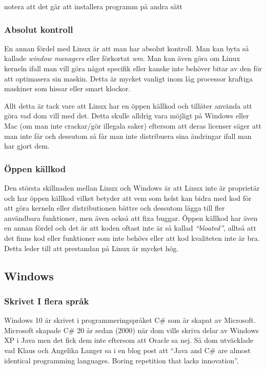 \documentclass[12pt, a4paper]{report}
\begin{document}
    \small{notera att det går att installera programm på andra sätt}


    \subsubsection{Absolut kontroll}

   En annan fördel med Linux är att man har absolut kontroll. Man kan byta så kallade \textit{window managers} eller förkortat \textit{wm}\cite{wm}. Man kan även göra om Linux kerneln ifall man vill göra något specifik eller kanske inte behöver bitar av den för att optimasera sin maskin. Detta är mycket vanligt inom låg processor kraftiga maskiner som hissar eller smart klockor.

   Allt detta är tack vare att Linux har en öppen källkod och tillåter använda att göra vad dom vill med det. Detta skulle alldrig vara möjligt på Windows eller Mac (om man inte crackar/gör illegala saker) eftersom att deras licenser säger att man inte får och dessutom så får man inte distribuera sina ändringar ifall man har gjort dem.

   \subsubsection{Öppen källkod}


   Den största skillnaden mellan Linux och Windows är att Linux inte är proprietär och har öppen källkod vilket betyder att vem som helst kan bidra med kod för att göra kerneln eller distributionen bättre och dessutom lägga till fler användbara funktioner, men även också att fixa buggar. Öppen källkod har även en annan fördel och det är att koden oftast inte är så kallad \textit{``bloated''}, alltså att det finns kod eller funktioner som inte behövs eller att kod kvaliteten inte är bra. Detta leder till att prestandan på Linux är mycket hög.

   \subsection{Windows}


    \subsubsection{Skrivet I flera språk}
    
    Windows 10 är skrivet i programmeringspråket C\# som är skapat av Microsoft\cite{c}. Microsoft skapade C\# 20 år sedan (2000) när dom ville skriva delar av Windows XP i Java men det fick dem inte eftersom att Oracle sa nej. Så dom utväcklade vad Klaus och Angelika Langer sa i en blog post att ``Java and C\# are almost identical programming languages. Boring repetition that lacks innovation''.\cite{cquote}  
    
\end{document}
